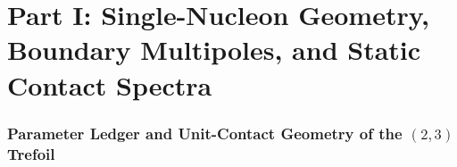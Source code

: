 \documentclass[11pt, a4paper]{article}
\begin{document}
\newpage
\tableofcontents
\newpage

\part*{Part I: Single-Nucleon Geometry, Boundary Multipoles, and Static Contact Spectra}
\section{\texorpdfstring{Parameter Ledger and Unit-Contact Geometry of the $(2,3)$ Trefoil}{Parameter Ledger and Unit-Contact Geometry of the (2,3) Trefoil}}
\label{sec:cube_tangent}
\end{document}
